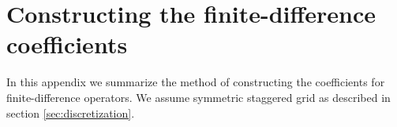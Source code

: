 
\chapter{Constructing the finite-difference coefficients}
\label{app:finite-diff}

In this appendix we summarize the method of constructing the coefficients for
finite-difference operators. We assume symmetric staggered grid as described in
section \ref{sec:discretization}.

